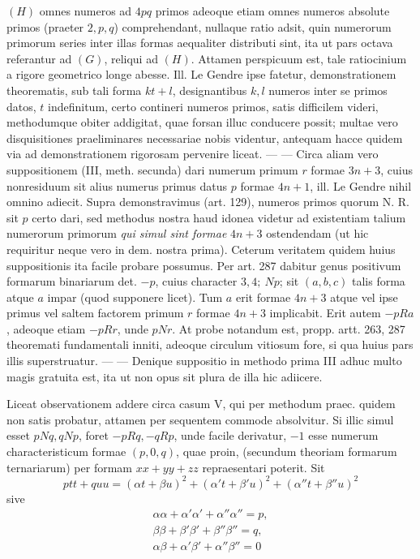 \((H)\) omnes numeros ad \(4pq\) primos adeoque etiam omnes numeros absolute primos (praeter \(2,p,q\)) comprehendant, nullaque ratio adsit, quin numerorum primorum series inter illas formas aequaliter distributi sint, ita ut pars octava referantur ad \((G)\), reliqui ad \((H)\). Attamen perspicuum est, tale ratiocinium a rigore geometrico longe abesse. Ill. Le Gendre ipse fatetur, demonstrationem theorematis, sub tali forma \(kt+l\), designantibus \(k,l\) numeros inter se primos datos, \(t\) indefinitum, certo contineri numeros primos, satis difficilem videri, methodumque obiter addigitat, quae forsan illuc conducere possit; multae vero disquisitiones praeliminares necessariae nobis videntur, antequam hacce quidem via ad demonstrationem rigorosam pervenire liceat. — — Circa aliam vero suppositionem (III, meth. secunda) dari numerum primum \(r\) formae \(3n+3\), cuius nonresiduum sit alius numerus primus datus \(p\) formae \(4n+1\), ill. Le Gendre nihil omnino adiecit. Supra demonstravimus (art. 129), numeros primos quorum N. R. sit \(p\) certo dari, sed methodus nostra haud idonea videtur ad existentiam talium numerorum primorum \textit{qui simul sint formae} \(4n+3\) ostendendam (ut hic requiritur neque vero in dem. nostra prima). Ceterum veritatem quidem huius suppositionis ita facile probare possumus. Per art. 287 dabitur genus positivum formarum binariarum det. \(-p\), cuius character \(3,4;\ Np\); sit \((a,b,c)\) talis forma atque \(a\) impar (quod supponere licet). Tum \(a\) erit formae \(4n+3\) atque vel ipse primus vel saltem factorem primum \(r\) formae \(4n+3\) implicabit. Erit autem \(-pRa\), adeoque etiam \(-pRr\), unde \(pNr\). At probe notandum est, propp. artt. 263, 287 theoremati fundamentali inniti, adeoque circulum vitiosum fore, si qua huius pars illis superstruatur. — — Denique suppositio in methodo prima III adhuc multo magis gratuita est, ita ut non opus sit plura de illa hic adiicere.

Liceat observationem addere circa casum V, qui per methodum praec. quidem non satis probatur, attamen per sequentem commode absolvitur. Si illic simul esset \(pNq,qNp\), foret \(-pRq,-qRp\), unde facile derivatur, \(-1\) esse numerum characteristicum formae \((p,0,q)\), quae proin, (secundum theoriam formarum ternariarum) per formam \(xx+yy+zz\) repraesentari poterit. Sit 
\[ptt+quu=(\alpha t+\beta u)^2+(\alpha't+\beta'u)^2+(\alpha''t+\beta''u)^2\]
 sive 
\[\begin{gathered}\alpha\alpha+\alpha'\alpha'+\alpha''\alpha''=p,\\\beta\beta+\beta'\beta'+\beta''\beta''=q,\\\alpha\beta+\alpha'\beta'+\alpha''\beta''=0\end{gathered}\]


